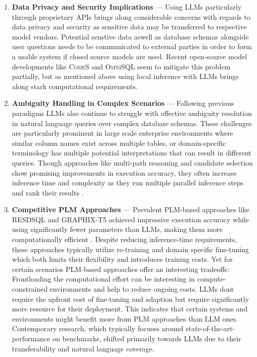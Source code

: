 \documentclass{article}
\begin{document}
\begin{enumerate}
    \item \textbf{Data Privacy and Security Implications} — Using LLMs particularly through proprietary APIs brings
           along considerable concerns with regards to data privacy and security as sensitive data may be transferred
           to respective model vendors. Potential senstive data aswell as database schemas alongside user questions
           needs to be communicated to external parties in order to form a usable system if closed source models are
           used. Recent open-source model developments like \textsc{CodeS} and \textsc{OmniSQL} seem to mitigate this
           problem partially, but as mentioned above using local inference with LLMs brings along stark computational
           requirements.
    \item \textbf{Ambiguity Handling in Complex Scenarios} — Following previous paradigms LLMs also continue to struggle
           with effective ambiguity resolution in natural language queries over complex database schemas. These challenges
           are particularly prominent in large scale enterprise environments where similar column names exist across multiple
           tables, or domain-specific terminology has multiple potential interpretations that can result in different queries.
           Though approaches like multi-path reasoning and candidate selection show promising improvements in execution
           accuracy, they often increase inference time and complexity as they run multiple parallel inference steps and
           rank their results \citep{CHASE, XiYan}.
    \item \textbf{Competitive PLM Approaches} — Prevalent PLM-based approaches like RESDSQL and GRAPHIX-T5 achieved 
           impressive execution accuracy while using significantly fewer parameters than LLMs, making them more computationally
           efficient \citep{RESDSQL}. Despite reducing inference-time requirements, these approaches typically utilize
           re-training and domain specific fine-tuning which both limits their flexibility and introduces training costs.
           Yet for certain scenarios PLM-based approaches offer an interesting tradeoffs: Frontloading the computational effort
           can be interesting in compute-constrained environments and help to reduce ongoing costs. LLMs dont require the upfront
           cost of fine-tuning and adaption but require significantly more resource for their deployment. This indicates
           that certain systems and environments might benefit more from PLM approaches than LLM ones. Contemporary research,
           which typically focuses around state-of-the-art-performance on benchmarks, shifted primarily towards LLMs due to
           their transferability and natural language coverage.
\end{enumerate}
\end{document}
